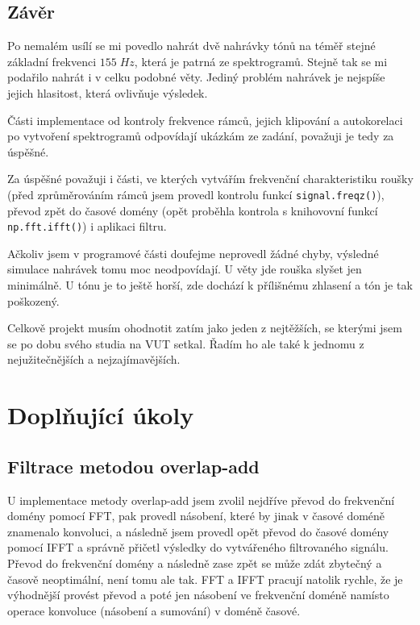 \documentclass[12pt]{article}
\begin{document}
\subsection{Závěr}
\hspace{1.5em}Po nemalém usílí se mi povedlo nahrát dvě nahrávky tónů na téměř stejné základní frekvenci $155\;Hz$, která je patrná ze spektrogramů. Stejně tak se mi podařilo nahrát i v celku podobné věty. Jediný problém nahrávek je nejspíše jejich hlasitost, která ovlivňuje výsledek.

\hspace{1.5em}Části implementace od kontroly frekvence rámců, jejich klipování a autokorelaci po vytvoření spektrogramů odpovídají ukázkám ze zadání, považuji je tedy za úspěšné.

\hspace{1.5em}Za úspěšné považuji i části, ve kterých vytvářím frekvenční charakteristiku roušky (před zprůměrováním rámců jsem provedl kontrolu funkcí \texttt{signal.freqz()}), převod zpět do časové domény (opět proběhla kontrola s knihovovní funkcí \texttt{np.fft.ifft()}) i aplikaci filtru.

\hspace{1.5em}Ačkoliv jsem v programové části doufejme neprovedl žádné chyby, výsledné simulace nahrávek tomu moc neodpovídají. U věty jde rouška slyšet jen minimálně. U tónu je to ještě horší, zde dochází k přílišnému zhlasení a tón je tak poškozený.

\hspace{1.5em}Celkově projekt musím ohodnotit zatím jako jeden z nejtěžších, se kterými jsem se po dobu svého studia na VUT setkal. Řadím ho ale také k jednomu z nejužitečnějších a nejzajímavějších.

\newpage
\section*{Doplňující úkoly}
\subsection{Filtrace metodou overlap-add}
\hspace{1.5em}U implementace metody overlap-add jsem zvolil nejdříve převod do frekvenční domény pomocí FFT, pak provedl násobení, které by jinak v časové doméně znamenalo konvoluci, a následně jsem provedl opět převod do časové domény pomocí IFFT a správně přičetl výsledky do vytvářeného filtrovaného signálu. Převod do frekvenční domény a následně zase zpět se může zdát zbytečný a časově neoptimální, není tomu ale tak. FFT a IFFT pracují natolik rychle, že je výhodnější provést převod a poté jen násobení ve frekvenční doméně namísto operace konvoluce (násobení a sumování) v doméně časové. 
\end{document}
